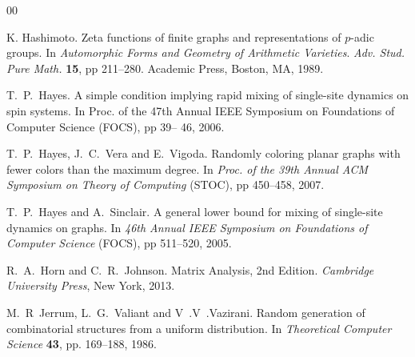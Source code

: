 \documentclass[11pt,reqno]{amsart}
\numberwithin{equation}{section}
\begin{document}
\begin{thebibliography}{00}






K. Hashimoto. 
Zeta functions of finite graphs and representations of $p$-adic groups. In {\em Automorphic Forms and Geometry of Arithmetic Varieties}. 
{\em Adv. Stud. Pure Math.} {\bf 15}, pp 211--280. Academic Press, Boston, MA, 1989.



T.~P.~Hayes. A simple condition implying rapid mixing of single-site dynamics on spin systems.
In {Proc. of the 47th Annual IEEE Symposium on Foundations of Computer Science} (FOCS), pp 39-- 46, 2006. 


T.~P.~Hayes, J.~C.~Vera and E.~Vigoda.
Randomly coloring planar graphs with fewer colors than the maximum degree. 
In {\em Proc. of the 39th Annual {ACM} Symposium on Theory of Computing} (STOC), pp 450--458, 2007. 



T.~P.~Hayes and A.~Sinclair.
A general lower bound for mixing of single-site dynamics on graphs. 
In {\em 46th Annual {IEEE} Symposium on Foundations of Computer Science} (FOCS), pp 511--520, 2005. 






R.~A.~Horn and C.~R.~Johnson. Matrix Analysis, 2nd Edition. {\em Cambridge University Press}, New York, 2013. 






M.~R~Jerrum, L.~G.~Valiant and V~.V~.Vazirani. Random generation of combinatorial structures from a uniform distribution. 
In {\em Theoretical Computer Science} {\bf 43}, pp. 169--188, 1986.




\end{thebibliography}
\end{document}
